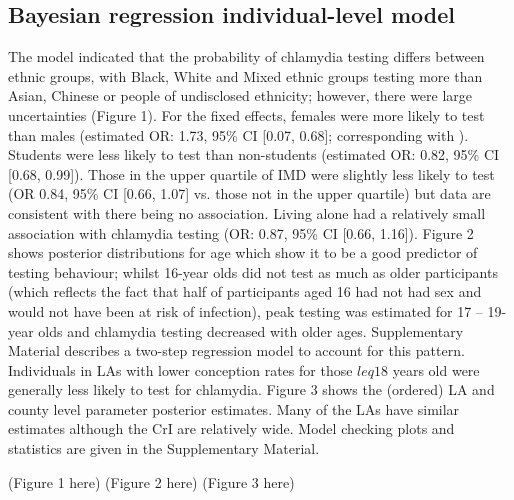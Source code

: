 \documentclass[12pt]{article}
\begin{document}
\subsection*{Bayesian regression individual-level model}
The model indicated that the probability of chlamydia testing differs between ethnic groups, with Black, White and Mixed ethnic groups testing more than Asian, Chinese or people of undisclosed ethnicity; however, there were large uncertainties (Figure 1). For the fixed effects, females were more likely to test than males (estimated OR: 1.73, 95\% CI [0.07, 0.68]; corresponding with \cite{Sonnenberg2013}). Students were less likely to test than non-students (estimated OR: 0.82, 95\% CI [0.68, 0.99]). Those in the upper quartile of IMD were slightly less likely to test (OR 0.84, 95\% CI [0.66, 1.07] vs. those not in the upper quartile) but data are consistent with there being no association. Living alone had a relatively small association with chlamydia testing (OR: 0.87, 95\% CI [0.66, 1.16]). Figure 2 shows posterior distributions for age which show it to be a good predictor of testing behaviour; whilst 16-year olds did not test as much as older participants (which reflects the fact that half of participants aged 16 had not had sex and would not have been at risk of infection), peak testing was estimated for 17 – 19-year olds and chlamydia testing decreased with older ages. Supplementary Material describes a two-step regression model to account for this pattern. Individuals in LAs with lower conception rates for those $leq 18$ years old were generally less likely to test for chlamydia. Figure 3 shows the (ordered) LA and county level parameter posterior estimates. Many of the LAs have similar estimates although the CrI are relatively wide. Model checking plots and statistics are given in the Supplementary Material.

(Figure 1 here)
(Figure 2 here)
(Figure 3 here)
\end{document}
